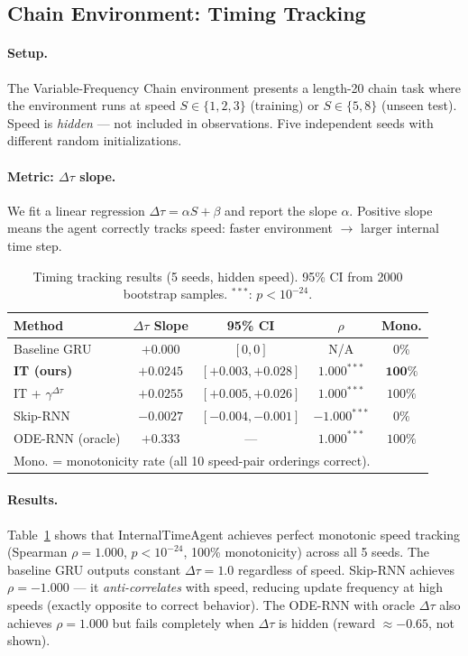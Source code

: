 \documentclass[10pt,twocolumn]{article}
\newcommand{\deltatau}{\Delta\tau}
\theoremstyle{plain}
\theoremstyle{definition}
\begin{document}
\subsection{Chain Environment: Timing Tracking}
\label{sec:exp_chain}

\paragraph{Setup.}
The Variable-Frequency Chain environment presents a length-20 chain task where
the environment runs at speed $S \in \{1, 2, 3\}$ (training) or $S \in \{5, 8\}$
(unseen test). Speed is \emph{hidden} --- not included in observations.
Five independent seeds with different random initializations.

\paragraph{Metric: $\deltatau$ slope.}
We fit a linear regression $\deltatau = \alpha S + \beta$ and report the slope $\alpha$.
Positive slope means the agent correctly tracks speed: faster environment $\to$
larger internal time step.

\begin{table}[t]
\centering
\caption{Timing tracking results (5 seeds, hidden speed).
95\% CI from 2000 bootstrap samples. $^{***}$: $p < 10^{-24}$.}
\label{tab:main}
\small
\begin{tabular}{lcccc}
\toprule
Method & $\deltatau$ Slope & 95\% CI & $\rho$ & Mono. \\
\midrule
Baseline GRU & $+0.000$ & $[0,0]$ & N/A & 0\% \\
\textbf{IT (ours)} & $\mathbf{+0.0245}$ & $[+0.003, +0.028]$ & $\mathbf{1.000^{***}}$ & $\mathbf{100\%}$ \\
IT + $\gamma^{\deltatau}$ & $+0.0255$ & $[+0.005, +0.026]$ & $1.000^{***}$ & $100\%$ \\
Skip-RNN & $-0.0027$ & $[-0.004, -0.001]$ & $-1.000^{***}$ & $0\%$ \\
ODE-RNN (oracle) & $+0.333$ & --- & $1.000^{***}$ & $100\%$ \\
\bottomrule
\multicolumn{5}{l}{\small Mono. = monotonicity rate (all 10 speed-pair orderings correct).}
\end{tabular}
\vspace{-0.5em}
\end{table}

\paragraph{Results.}
Table~\ref{tab:main} shows that InternalTimeAgent achieves perfect monotonic
speed tracking (Spearman $\rho = 1.000$, $p < 10^{-24}$, 100\% monotonicity)
across all 5 seeds. The baseline GRU outputs constant $\deltatau = 1.0$ regardless
of speed. Skip-RNN achieves $\rho = -1.000$ --- it \emph{anti-correlates} with
speed, reducing update frequency at high speeds (exactly opposite to correct behavior).
The ODE-RNN with oracle $\deltatau$ also achieves $\rho = 1.000$ but fails
completely when $\deltatau$ is hidden (reward $\approx -0.65$, not shown).
\end{document}
